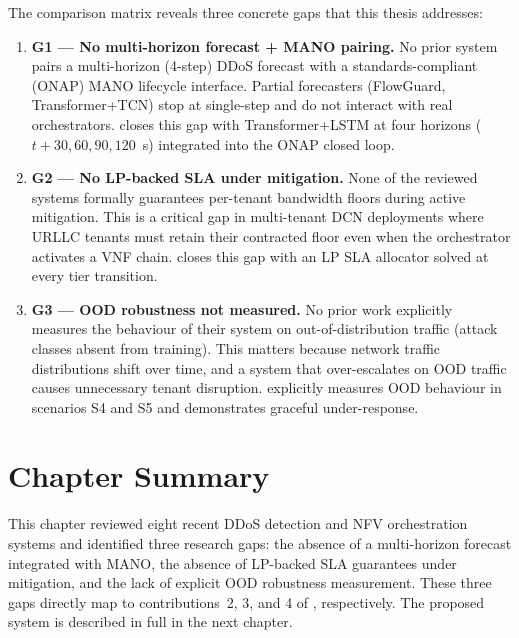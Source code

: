 The comparison matrix reveals three concrete gaps that this thesis
addresses:

\begin{enumerate}
  \item \textbf{G1 --- No multi-horizon forecast + MANO pairing.}
        No prior system pairs a multi-horizon (4-step) DDoS forecast
        with a standards-compliant (ONAP) MANO lifecycle interface.
        Partial forecasters (FlowGuard, Transformer+TCN) stop at
        single-step and do not interact with real orchestrators.
        \padonap{} closes this gap with Transformer+LSTM at four
        horizons ($t{+}30, 60, 90, 120$~s) integrated into the ONAP
        closed loop.

  \item \textbf{G2 --- No LP-backed SLA under mitigation.}
        None of the reviewed systems formally guarantees per-tenant
        bandwidth floors during active mitigation. This is a critical
        gap in multi-tenant DCN deployments where URLLC tenants must
        retain their contracted floor even when the orchestrator
        activates a VNF chain. \padonap{} closes this gap with an
        LP SLA allocator solved at every tier transition.

  \item \textbf{G3 --- OOD robustness not measured.}
        No prior work explicitly measures the behaviour of their system
        on out-of-distribution traffic (attack classes absent from
        training). This matters because network traffic distributions
        shift over time, and a system that over-escalates on OOD traffic
        causes unnecessary tenant disruption. \padonap{} explicitly
        measures OOD behaviour in scenarios S4 and S5 and demonstrates
        graceful under-response.
\end{enumerate}

\section{Chapter Summary}
\label{sec:related-summary}

This chapter reviewed eight recent DDoS detection and NFV orchestration
systems and identified three research gaps: the absence of a multi-horizon
forecast integrated with MANO, the absence of LP-backed SLA guarantees
under mitigation, and the lack of explicit OOD robustness measurement.
These three gaps directly map to contributions~2, 3, and 4 of \padonap{},
respectively. The proposed system is described in full in the next chapter.
